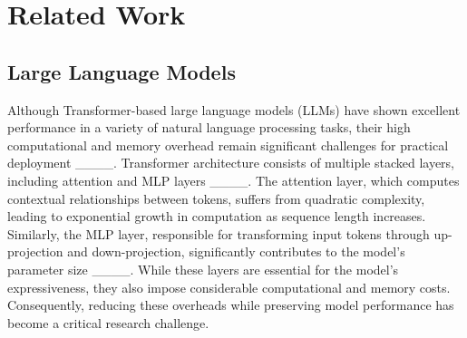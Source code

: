 \section{Related Work}
\subsection{Large Language Models}
Although Transformer-based large language models (LLMs) have shown excellent performance in a variety of natural language processing tasks, their high computational and memory overhead remain significant challenges for practical deployment ____. Transformer architecture consists of multiple stacked layers, including attention and MLP layers ____. The attention layer, which computes contextual relationships between tokens, suffers from quadratic complexity, leading to exponential growth in computation as sequence length increases. Similarly, the MLP layer, responsible for transforming input tokens through up-projection and down-projection, significantly contributes to the model's parameter size ____. While these layers are essential for the model's expressiveness, they also impose considerable computational and memory costs. Consequently, reducing these overheads while preserving model performance has become a critical research challenge.



